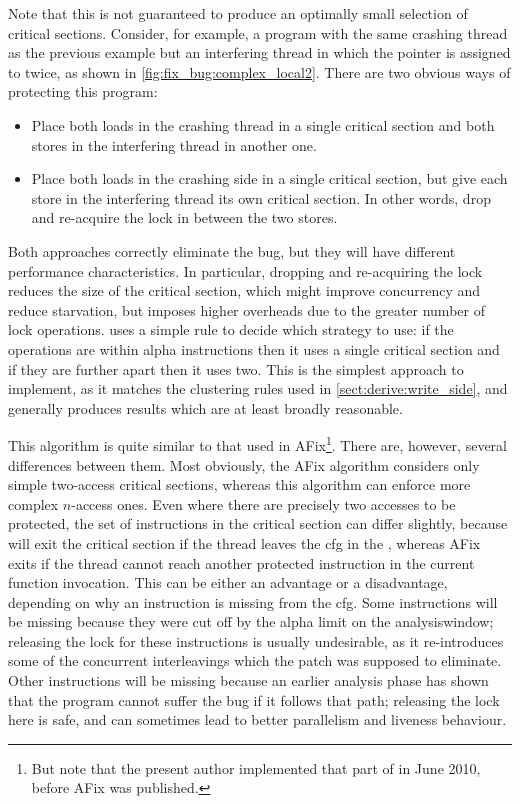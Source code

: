 Note that this is not guaranteed to produce an optimally small
selection of critical sections.  Consider, for example, a program with
the same crashing thread as the previous example but an interfering
thread in which the pointer is assigned to twice, as shown in
\autoref{fig:fix_bug:complex_local2}.  There are two obvious ways of
protecting this program:
\begin{itemize}
\item
  Place both loads in the crashing thread in a single critical section and
  both stores in the interfering thread in another one.
\item
  Place both loads in the crashing side in a single critical section,
  but give each store in the interfering thread its own critical
  section.  In other words, drop and re-acquire the lock in between
  the two stores.
\end{itemize}
Both approaches correctly eliminate the bug, but they will have
different performance characteristics.  In particular, dropping and
re-acquiring the lock reduces the size of the critical section, which
might improve concurrency and reduce starvation, but imposes higher
overheads due to the greater number of lock operations.  {\Technique}
uses a simple rule to decide which strategy to use: if the operations
are within \gls{alpha} instructions then it uses a single critical
section and if they are further apart then it uses two.  This is the
simplest approach to implement, as it matches the clustering rules
used in \autoref{sect:derive:write_side}, and generally produces
results which are at least broadly reasonable.

\label{sect:fixing:rw_afix}
 This algorithm is quite similar to
that used in AFix\cite{Jin2011}\footnote{But note that the present
  author implemented that part of {\implementation} in June 2010,
  before AFix was published.}.  There are, however, several
differences between them.  Most obviously, the AFix algorithm
considers only simple two-access critical sections, whereas this
algorithm can enforce more complex $n$-access ones.  Even where there
are precisely two accesses to be protected, the set of instructions in
the critical section can differ slightly, because {\technique} will
exit the critical section if the thread leaves the \gls{cfg} in the
{\StateMachine}, whereas AFix exits if the thread cannot reach another
protected instruction in the current function invocation.  This can be
either an advantage or a disadvantage, depending on why an instruction
is missing from the {\StateMachine} \gls{cfg}.  Some instructions will
be missing because they were cut off by the \gls{alpha} limit on the
\gls{analysiswindow}; releasing the lock for these instructions is
usually undesirable, as it re-introduces some of the concurrent
interleavings which the patch was supposed to eliminate.  Other
instructions will be missing because an earlier analysis phase has
shown that the program cannot suffer the bug if it follows that path;
releasing the lock here is safe, and can sometimes lead to better
parallelism and liveness behaviour.

